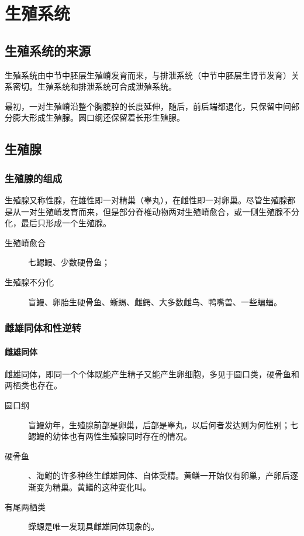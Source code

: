 \section{生殖系统}

\subsection{生殖系统的来源}

生殖系统由中节中胚层生殖嵴发育而来，与排泄系统（中节中胚层生肾节发育）关系密切。生殖系统和排泄系统可合成泄殖系统。

最初，一对生殖嵴沿整个胸腹腔的长度延伸，随后，前后端都退化，只保留中间部分膨大形成生殖腺。圆口纲还保留着长形生殖腺。

\subsection{生殖腺}

\subsubsection{生殖腺的组成}

生殖腺又称性腺，在雄性即一对精巢（睾丸），在雌性即一对卵巢。尽管生殖腺都是从一对生殖嵴发育而来，但是部分脊椎动物两对生殖嵴愈合，或一侧生殖腺不分化，最后只形成一个生殖腺。

\begin{description}
	\item[生殖嵴愈合] 七鳃鳗、少数硬骨鱼；
	\item[生殖腺不分化] 盲鳗、卵胎生硬骨鱼、蜥蜴、雌鳄、大多数雌鸟、鸭嘴兽、一些蝙蝠。
\end{description}

\subsubsection{雌雄同体和性逆转}

\paragraph{雌雄同体}

雌雄同体，即同一个个体既能产生精子又能产生卵细胞，多见于圆口类，硬骨鱼和两栖类也存在。

\begin{description}
	\item[圆口纲] 盲鳗幼年，生殖腺前部是卵巢，后部是睾丸，以后何者发达则为何性别；七鳃鳗的幼体也有两性生殖腺同时存在的情况。
	\item[硬骨鱼] 、海鲋的许多种终生雌雄同体、自体受精。黄鳝一开始仅有卵巢，产卵后逐渐变为精巢。黄鳝的这种变化叫。
	\item[有尾两栖类] 蝾螈是唯一发现具雌雄同体现象的。
\end{description}

